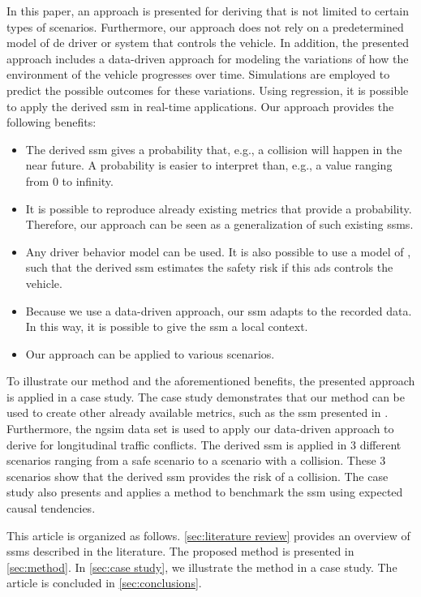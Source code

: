 In this paper, an approach is presented for deriving  that is not limited to certain types of scenarios.
Furthermore, our approach does not rely on a predetermined model of de driver or system that controls the vehicle. 
In addition, the presented approach includes a data-driven approach for modeling the variations of how the environment of the vehicle progresses over time.
Simulations are employed to predict the possible outcomes for these variations.
Using regression, it is possible to apply the derived \ac{ssm} in real-time applications.
Our approach provides the following benefits:
\begin{itemize}
	\item The derived \ac{ssm} gives a probability that, e.g., a collision will happen in the near future. 
	A probability is easier to interpret than, e.g., a value ranging from 0 to infinity.
	
	\item It is possible to reproduce already existing metrics that provide a probability. 
	Therefore, our approach can be seen as a generalization of such existing \acp{ssm}.
	
	\item Any driver behavior model can be used.
	It is also possible to use a model of , such that the derived \ac{ssm} estimates the safety risk if this \ac{ads} controls the vehicle.
	
	\item Because we use a data-driven approach, our \ac{ssm} adapts to the recorded data. 
	In this way, it is possible to give the \ac{ssm} a local context.
	
	\item Our approach can be applied to various scenarios.
\end{itemize}

To illustrate our method and the aforementioned benefits, the presented approach is applied in a case study.
The case study demonstrates that our method can be used to create other already available metrics, such as the \ac{ssm} presented in \autocite{wang2014evaluation}.
Furthermore, the \ac{ngsim} data set \autocite{kovvali2007video} is used to apply our data-driven approach to derive  for longitudinal traffic conflicts.
The derived \ac{ssm} is applied in 3 different scenarios ranging from a safe scenario to a scenario with a collision.
These 3 scenarios show that the derived \ac{ssm} provides the risk of a collision.
The case study also presents and applies a method to benchmark the \ac{ssm} using expected causal tendencies.

This article is organized as follows.
\cref{sec:literature review} provides an overview of \acp{ssm} described in the literature.
The proposed method is presented in \cref{sec:method}.
In \cref{sec:case study}, we illustrate the method in a case study.
The article is concluded in \cref{sec:conclusions}.
